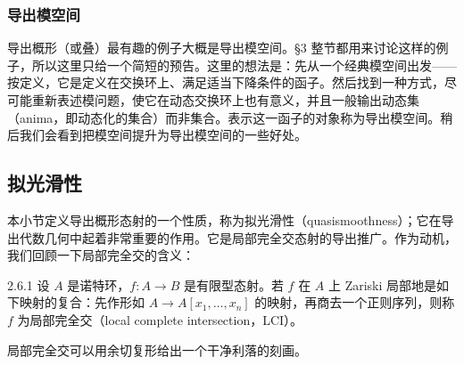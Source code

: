 \subsubsection{导出模空间}

导出概形（或叠）最有趣的例子大概是导出模空间。§3 整节都用来讨论这样的例子，所以这里只给一个简短的预告。这里的想法是：先从一个经典模空间出发——按定义，它是定义在交换环上、满足适当下降条件的函子。然后找到一种方式，尽可能重新表述模问题，使它在动态交换环上也有意义，并且一般输出动态集（anima，即动态化的集合）而非集合。表示这一函子的对象称为导出模空间。稍后我们会看到把模空间提升为导出模空间的一些好处。

\subsection{拟光滑性}

本小节定义导出概形态射的一个性质，称为拟光滑性（quasismoothness）；它在导出代数几何中起着非常重要的作用。它是局部完全交态射的导出推广。作为动机，我们回顾一下局部完全交的含义：

\begin{defn}{2.6.1}\label{defn:a6-01-1}
设 $A$ 是诺特环，$f:A\to B$ 是有限型态射。若 $f$ 在 $A$ 上 Zariski 局部地是如下映射的复合：先作形如 $A\to A[x_1,\dots,x_n]$ 的映射，再商去一个正则序列，则称 $f$ 为局部完全交（local complete intersection，LCI）。
\end{defn}

局部完全交可以用余切复形给出一个干净利落的刻画。
